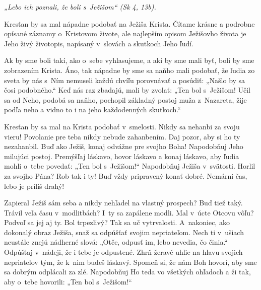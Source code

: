 


{\it „Lebo ich poznali, že boli s~Ježišom“ (Sk 4, 13b).}

Kresťan by sa mal nápadne podobať na Ježiša Krista. Čítame krásne a podrobne opísané záznamy o~Kristovom živote, ale najlepším opisom Ježišovho života je Jeho živý životopis, napísaný v~slovách a skutkoch Jeho ľudí.

Ak by sme boli takí, ako o~sebe vyhlasujeme, a akí by sme mali byť, boli by sme zobrazením Krista. Áno, tak nápadne by sme sa naňho mali podobať, že ľudia zo sveta by nás s~Ním nemuseli každú chvíľu porovnávať a posúdiť: „Našlo by sa čosi podobného.“ Keď nás raz zbadajú, mali by zvolať: „Ten bol s~Ježišom! Učil sa od Neho, podobá sa naňho, pochopil základný postoj muža z~Nazareta, žije podľa neho a vidno to i na jeho každodenných skutkoch.“

Kresťan by sa mal na Krista podobať v~smelosti. Nikdy sa nehanbi za svoju vieru! Povolanie pre teba nikdy nebude zahanbením. Daj pozor, aby si ho ty nezahanbil. Buď ako Ježiš, konaj odvážne pre svojho Boha! Napodobňuj Jeho milujúci postoj. Premýšľaj láskavo, hovor láskavo a konaj láskavo, aby ľudia mohli o~tebe povedať: „Ten bol s~Ježišom!“ Napodobňuj Ježiša v~svätosti. Horlil za svojho Pána? Rob tak i ty! Buď vždy pripravený konať dobré. Nemárni čas, lebo je príliš drahý!

Zapieral Ježiš sám seba a nikdy nehľadel na vlastný prospech? Buď tiež taký. Trávil veľa času v~modlitbách? I~ty sa zapálene modli. Mal v~úcte Otcovu vôľu? Podvoľ sa jej aj ty. Bol trpezlivý? Tak sa uč vytrvalosti. A~nakoniec, ako dokonalý obraz Ježiša, snaž sa odpúšťať svojim nepriateľom. Nech ti v~ušiach neustále znejú nádherné slová: „Otče, odpusť im, lebo nevedia, čo činia.“ Odpúšťaj v~nádeji, že i tebe je odpustené. Zhrň žeravé uhlie na hlavu svojich nepriateľov tým, že k~nim budeš láskavý. Spomeň si, že nám Boh hovorí, aby sme sa dobrým odplácali za zlé. Napodobňuj Ho teda vo všetkých ohľadoch a ži tak, aby o~tebe hovorili: „Ten bol s~Ježišom!“



